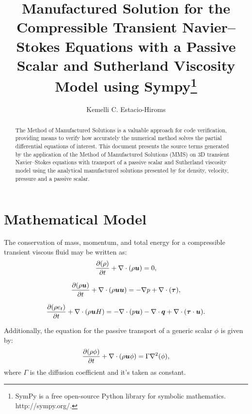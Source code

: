\documentclass[10pt]{article}
\title{Manufactured Solution for the Compressible Transient Navier--Stokes Equations  with a Passive Scalar and Sutherland Viscosity Model using Sympy\footnote{SymPy is a free open-source Python library for symbolic mathematics.  http://sympy.org/.}}
\author{Kemelli C. Estacio-Hiroms}
\newcommand{\D}{\partial}
\newcommand{\Diff}[2] {\dfrac{\partial( #1)}{\partial #2}}
\newcommand{\bv}[1]{\ensuremath{\mbox{\boldmath$ #1 $}}}
\begin{document}
\maketitle

\begin{abstract}
The Method of Manufactured Solutions is a valuable approach for code verification, providing means to verify how accurately the numerical method solves the partial differential equations of interest.
This document presents the source terms generated by the application of the Method of Manufactured Solutions (MMS) on 3D transient Navier--Stokes equations  with transport of a passive scalar and Sutherland viscosity model using the analytical manufactured solutions presented by \citet{Roy2002} for density, velocity, pressure and a passive scalar.
\end{abstract}





\section{Mathematical Model}
The conservation of mass, momentum, and total energy for a compressible transient viscous fluid may be written as:
\begin{equation}
 \label{eq:ns_01}
\Diff{\rho}{t} +\nabla \cdot \left(\rho \bv{u}\right) = 0,
\end{equation}

\begin{equation}
 \label{eq:ns_02}
\Diff{\rho \bv{u}}{t} +\nabla\cdot\left(\rho\bv{u}\bv{u}\right) = -\nabla p+  \nabla \cdot (\bv{\tau} ),
\end{equation}

\begin{equation}
 \label{eq:ns_03}
\Diff{\rho e_t}{t} +\nabla\cdot\left(\rho \bv{u} H\right) =-   \nabla\cdot(p  \bv{u}) -\nabla\cdot \bv{q} +  \nabla \cdot (\bv{\tau} \cdot \bv{u}).
\end{equation}

Additionally, the equation for the passive transport of a generic scalar $\phi$ is given by:
\begin{equation}
 \label{eq:ns_pscalar}
  \frac{\D (\rho \phi)}{\D t} + \nabla\cdot\left(\rho\bv{u}\phi\right) = \Gamma \nabla^2 (\phi),
\end{equation}
where $\Gamma$ is the diffusion coefficient and it's taken as constant.
\end{document}
